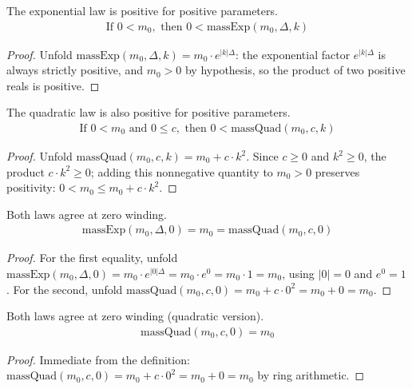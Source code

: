 \begin{theorem}
The exponential law is positive for positive parameters.
\begin{align*}
\text{If } 0 < m_0, \text{ then } 0 < \text{massExp}(m_0, \Delta, k)
\end{align*}
\begin{proof}
Unfold $\text{massExp}(m_0,\Delta,k)=m_0\cdot e^{|k|\Delta}$: the exponential factor $e^{|k|\Delta}$ is always strictly positive, and $m_0>0$ by hypothesis, so the product of two positive reals is positive.
\end{proof}
\end{theorem}

\begin{theorem}
The quadratic law is also positive for positive parameters.
\begin{align*}
\text{If } 0 < m_0 \text{ and } 0 \le c, \text{ then } 0 < \text{massQuad}(m_0, c, k)
\end{align*}
\begin{proof}
Unfold $\text{massQuad}(m_0,c,k)=m_0+c\cdot k^2$. Since $c\geq0$ and $k^2\geq0$, the product $c\cdot k^2\geq0$; adding this nonnegative quantity to $m_0>0$ preserves positivity: $0<m_0\leq m_0+c\cdot k^2$.
\end{proof}
\end{theorem}

\begin{proposition}
Both laws agree at zero winding.
\begin{align*}
\text{massExp}(m_0, \Delta, 0) = m_0 = \text{massQuad}(m_0, c, 0)
\end{align*}
\begin{proof}
For the first equality, unfold $\text{massExp}(m_0,\Delta,0) = m_0\cdot e^{|0|\Delta} = m_0\cdot e^{0} = m_0\cdot1=m_0$, using $|0|=0$ and $e^0=1$. For the second, unfold $\text{massQuad}(m_0,c,0) = m_0+c\cdot0^2 = m_0+0=m_0$.
\end{proof}
\end{proposition}

\begin{proposition}
Both laws agree at zero winding (quadratic version).
\begin{align*}
\text{massQuad}(m_0, c, 0) = m_0
\end{align*}
\begin{proof}
Immediate from the definition: $\text{massQuad}(m_0,c,0) = m_0 + c\cdot0^2 = m_0+0 = m_0$ by ring arithmetic.
\end{proof}
\end{proposition}

